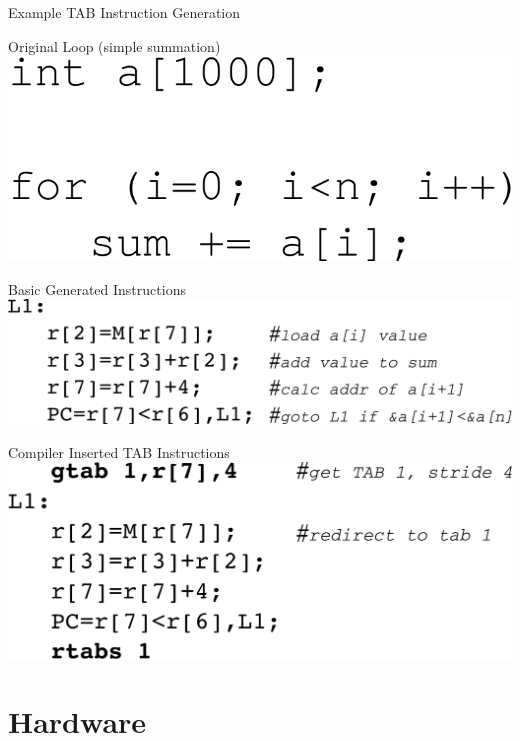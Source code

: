 \documentclass{beamer}
\begin{document}
\begin{frame}{Example TAB Instruction Generation}
   \vspace{-0.2cm}
   \begin{footnotesize}
      \begin{block}{Original Loop (simple summation)}
         \includegraphics[scale=0.25]{figures/compiler_example_1-1.pdf}
      \end{block}
      \vspace{-0.2cm}
      \begin{block}{Basic Generated Instructions}
         \includegraphics[scale=0.25]{figures/compiler_example_1-2.pdf}
      \end{block}
      \vspace{-0.2cm}
      \begin{block}{Compiler Inserted TAB Instructions}
         \includegraphics[scale=0.25]{figures/compiler_example_1-3.pdf}
      \end{block}
   \end{footnotesize}
\end{frame}
\section{Hardware}
\end{document}

